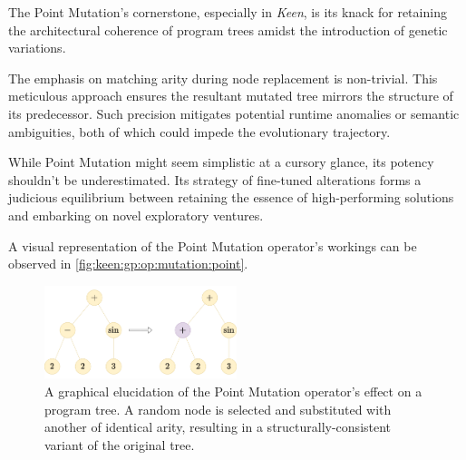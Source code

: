     The Point Mutation's cornerstone, especially in \textit{Keen}, is its knack for retaining the architectural 
    coherence of program trees amidst the introduction of genetic variations.

    \begin{remark}
        The emphasis on matching arity during node replacement is non-trivial. This meticulous approach ensures the 
        resultant mutated tree mirrors the structure of its predecessor. Such precision mitigates potential runtime 
        anomalies or semantic ambiguities, both of which could impede the evolutionary trajectory.
    \end{remark}

    While Point Mutation might seem simplistic at a cursory glance, its potency 
    shouldn't be underestimated. Its strategy of fine-tuned alterations forms a 
    judicious equilibrium between retaining the essence of high-performing 
    solutions and embarking on novel exploratory ventures.

    A visual representation of the Point Mutation operator's workings can be 
    observed in \vref{fig:keen:gp:op:mutation:point}.

    \begin{figure}[ht!]
        \centering
        \includegraphics[width=0.5\textwidth]{img/keen/Point mutation.png}
        \caption{
        A graphical elucidation of the Point Mutation operator's effect on a 
        program tree. A random node is selected and substituted with another of 
        identical arity, resulting in a structurally-consistent variant of the 
        original tree.
        }
        \label{fig:keen:gp:op:mutation:point}
    \end{figure}
